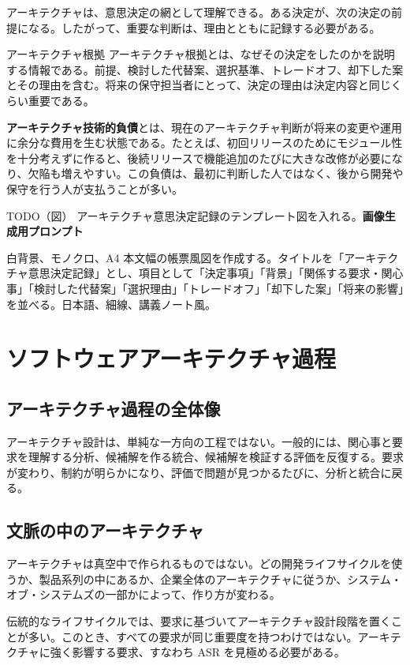 \documentclass[a4paper,11pt]{ltjsarticle}
\newcommand{\todofig}[2]{\begin{statementbox}{TODO（図） #1}\textbf{画像生成用プロンプト}\par #2\end{statementbox}}
\newcommand{\keyterm}[1]{\textbf{#1}}
\begin{document}
アーキテクチャは、意思決定の網として理解できる。ある決定が、次の決定の前提になる。したがって、重要な判断は、理由とともに記録する必要がある。

\begin{statementbox}{アーキテクチャ根拠}
アーキテクチャ根拠とは、なぜその決定をしたのかを説明する情報である。前提、検討した代替案、選択基準、トレードオフ、却下した案とその理由を含む。将来の保守担当者にとって、決定の理由は決定内容と同じくらい重要である。
\end{statementbox}

\keyterm{アーキテクチャ技術的負債}とは、現在のアーキテクチャ判断が将来の変更や運用に余分な費用を生む状態である。たとえば、初回リリースのためにモジュール性を十分考えずに作ると、後続リリースで機能追加のたびに大きな改修が必要になり、欠陥も増えやすい。この負債は、最初に判断した人ではなく、後から開発や保守を行う人が支払うことが多い。

\todofig{アーキテクチャ意思決定記録のテンプレート図を入れる。}{白背景、モノクロ、A4 本文幅の帳票風図を作成する。タイトルを「アーキテクチャ意思決定記録」とし、項目として「決定事項」「背景」「関係する要求・関心事」「検討した代替案」「選択理由」「トレードオフ」「却下した案」「将来の影響」を並べる。日本語、細線、講義ノート風。}

\section{ソフトウェアアーキテクチャ過程}

\subsection*{アーキテクチャ過程の全体像}
アーキテクチャ設計は、単純な一方向の工程ではない。一般的には、関心事と要求を理解する分析、候補解を作る統合、候補解を検証する評価を反復する。要求が変わり、制約が明らかになり、評価で問題が見つかるたびに、分析と統合に戻る。

\subsection{文脈の中のアーキテクチャ}
アーキテクチャは真空中で作られるものではない。どの開発ライフサイクルを使うか、製品系列の中にあるか、企業全体のアーキテクチャに従うか、システム・オブ・システムズの一部かによって、作り方が変わる。

伝統的なライフサイクルでは、要求に基づいてアーキテクチャ設計段階を置くことが多い。このとき、すべての要求が同じ重要度を持つわけではない。アーキテクチャに強く影響する要求、すなわち ASR を見極める必要がある。
\end{document}
